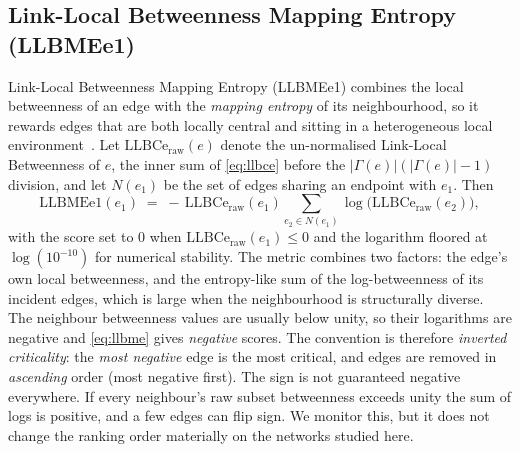 \documentclass[runningheads,11pt]{article}
\begin{document}
\subsection{Link-Local Betweenness Mapping Entropy (LLBMEe1)}
\label{sec:llbme}
Link-Local Betweenness Mapping Entropy (LLBMEe1) combines the local betweenness
of an edge with the \emph{mapping entropy} of its neighbourhood, so it rewards
edges that are both locally central and sitting in a heterogeneous local
environment~\cite{entropy2024llbme}. Let $\mathrm{LLBCe}_{\mathrm{raw}}(e)$
denote the un-normalised Link-Local Betweenness of $e$, the inner sum of
\cref{eq:llbce} before the $|\Gamma(e)|(|\Gamma(e)|-1)$ division, and let
$N(e_1)$ be the set of edges sharing an endpoint with $e_1$. Then
\begin{equation}
\mathrm{LLBMEe1}(e_1) \;=\;
-\,\mathrm{LLBCe}_{\mathrm{raw}}(e_1)
\sum_{e_2\in N(e_1)} \log\!\bigl(\mathrm{LLBCe}_{\mathrm{raw}}(e_2)\bigr),
\label{eq:llbme}
\end{equation}
with the score set to $0$ when $\mathrm{LLBCe}_{\mathrm{raw}}(e_1)\le 0$ and the
logarithm floored at $\log(10^{-10})$ for numerical stability. The metric
combines two factors: the edge's own local betweenness, and the entropy-like
sum of the log-betweenness of its incident edges, which is large when the
neighbourhood is structurally diverse. The neighbour betweenness values are
usually below unity, so their logarithms are negative and \cref{eq:llbme} gives
\emph{negative} scores. The convention is therefore \emph{inverted criticality}:
the \emph{most negative} edge is the most critical, and edges are removed in
\emph{ascending} order (most negative first). The sign is not guaranteed
negative everywhere. If every neighbour's raw subset betweenness exceeds unity
the sum of logs is positive, and a few edges can flip sign. We monitor this, but
it does not change the ranking order materially on the networks studied here.
\end{document}
